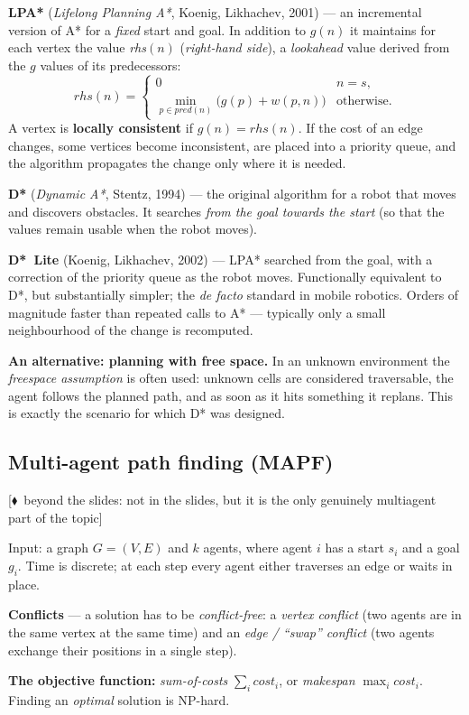 \documentclass[11pt,a4paper]{article}
\theoremstyle{definition}
\providecommand{\uv}[1]{``#1''}
\newcommand{\mimoq}[1]{\textcolor{markcol}{\textsf{\footnotesize[$\blacklozenge$~beyond the slides: #1]}}}
\begin{document}
\begin{defbox}
\textbf{LPA*} (\emph{Lifelong Planning A*}, Koenig, Likhachev, 2001) --- an incremental version of A*
for a \emph{fixed} start and goal. In addition to $g(n)$ it maintains for each vertex the value
\emph{rhs}$(n)$ (\emph{right-hand side}), a \emph{lookahead} value derived from the $g$ values of its
predecessors:
\[
\mathit{rhs}(n) = \begin{cases}
0 & n = s,\\
\min_{p \in \mathit{pred}(n)} \big(g(p) + w(p,n)\big) & \text{otherwise.}
\end{cases}
\]
A vertex is \textbf{locally consistent} if $g(n) = \mathit{rhs}(n)$. If the cost of an edge changes,
some vertices become inconsistent, are placed into a priority queue, and the algorithm propagates the
change only where it is needed.

\textbf{D*} (\emph{Dynamic A*}, Stentz, 1994) --- the original algorithm for a robot that moves and
discovers obstacles. It searches \emph{from the goal towards the start} (so that the values remain
usable when the robot moves).

\textbf{D*~Lite} (Koenig, Likhachev, 2002) --- LPA* searched from the goal, with a correction of the
priority queue as the robot moves. Functionally equivalent to D*, but substantially simpler; the
\emph{de facto} standard in mobile robotics. Orders of magnitude faster than repeated calls to A* ---
typically only a small neighbourhood of the change is recomputed.

\textbf{An alternative: planning with free space.} In an unknown environment the
\emph{freespace assumption} is often used: unknown cells are considered traversable, the agent follows
the planned path, and as soon as it hits something it replans. This is exactly the scenario for which
D* was designed.
\end{defbox}

\subsection{Multi-agent path finding (MAPF)}
\label{ssec:mapf}

\noindent\mimoq{not in the slides, but it is the only genuinely multiagent part of the topic}

\begin{defbox}
Input: a graph $G=(V,E)$ and $k$ agents, where agent $i$ has a start $s_i$ and a goal $g_i$.
Time is discrete; at each step every agent either traverses an edge or waits in place.

\textbf{Conflicts} --- a solution has to be \emph{conflict-free}: a \emph{vertex conflict}
(two agents are in the same vertex at the same time) and an \emph{edge / \uv{swap} conflict}
(two agents exchange their positions in a single step).

\textbf{The objective function:} \emph{sum-of-costs} $\sum_i \mathit{cost}_i$, or
\emph{makespan} $\max_i \mathit{cost}_i$. Finding an \emph{optimal} solution is NP-hard.
\end{defbox}
\end{document}
